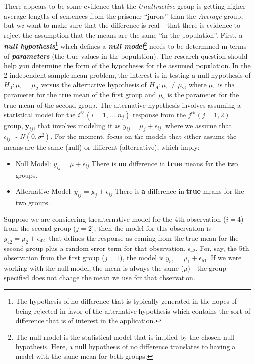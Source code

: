 \documentclass[]{book}
\let\rmarkdownfootnote\footnote%
\def\footnote{\protect\rmarkdownfootnote}
\begin{document}
There appears to be some evidence that the \emph{Unattractive} group is
getting higher average lengths of sentences from the prisoner ``jurors''
than the \emph{Average} group, but we want to make sure that the
difference is real -- that there is evidence to reject the assumption
that the means are the same ``in the population''. First, a
\textbf{\emph{null hypothesis}}\footnote{The hypothesis of no difference
  that is typically generated in the hopes of being rejected in favor of
  the alternative hypothesis which contains the sort of difference that
  is of interest in the application.} which defines a \textbf{\emph{null
model}}\footnote{The null model is the statistical model that is implied
  by the chosen null hypothesis. Here, a null hypothesis of no
  difference translates to having a model with the same mean for both
  groups.} needs to be determined in terms of \textbf{\emph{parameters}}
(the true values in the population). The research question should help
you determine the form of the hypotheses for the assumed population. In
the 2 independent sample mean problem, the interest is in testing a null
hypothesis of \(H_0: \mu_1 = \mu_2\) versus the alternative hypothesis
of \(H_A: \mu_1 \ne \mu_2\), where \(\mu_1\) is the parameter for the
true mean of the first group and \(\mu_2\) is the parameter for the true
mean of the second group. The alternative hypothesis involves assuming a
statistical model for the \(i^{th} (i=1,\ldots,n_j)\) response from the
\(j^{th} (j=1,2)\) group, \(\boldsymbol{y}_{ij}\), that involves
modeling it as \(y_{ij} = \mu_j + \epsilon_{ij}\), where we assume that
\(\epsilon_{ij} \sim N(0,\sigma^2)\). For the moment, focus on the
models that either assume the means are the same (null) or different
(alternative), which imply:

\begin{itemize}
\item
  Null Model: \(y_{ij} = \mu + \epsilon_{ij}\) There is \textbf{no}
  difference in \textbf{true} means for the two groups.
\item
  Alternative Model: \(y_{ij} = \mu_j + \epsilon_{ij}\) There is
  \textbf{a} difference in \textbf{true} means for the two groups.
\end{itemize}

Suppose we are considering thealternative model for the 4th observation
(\(i=4\)) from the second group (\(j=2\)), then the model for this
observation is \(y_{42} = \mu_2 +\epsilon_{42}\), that defines the
response as coming from the true mean for the second group plus a random
error term for that observation, \(\epsilon_{42}\). For, say, the 5th
observation from the first group (\(j=1\)), the model is
\(y_{51} = \mu_1 +\epsilon_{51}\). If we were working with the null
model, the mean is always the same (\(\mu\)) - the group specified does
not change the mean we use for that observation.
\end{document}
